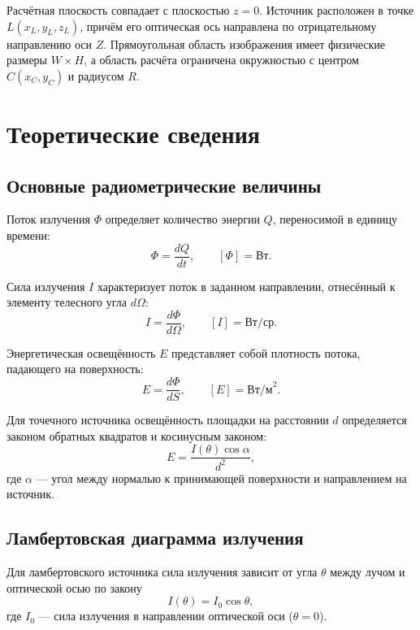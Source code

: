 \documentclass[a4paper,12pt]{article}
\begin{document}
Расчётная плоскость совпадает с плоскостью $z=0$. Источник расположен в точке
$L(x_L,y_L,z_L)$, причём его оптическая ось направлена по отрицательному
направлению оси $Z$. Прямоугольная область изображения имеет физические размеры
$W\times H$, а область расчёта ограничена окружностью с центром
$C(x_C,y_C)$ и радиусом $R$.

\section{Теоретические сведения}

\subsection{Основные радиометрические величины}

Поток излучения $\Phi$ определяет количество энергии $Q$, переносимой в единицу
времени:
\begin{equation}
  \Phi=\frac{dQ}{dt}, \qquad [\Phi]=\text{Вт}.
\end{equation}

Сила излучения $I$ характеризует поток в заданном направлении, отнесённый к
элементу телесного угла $d\Omega$:
\begin{equation}
  I=\frac{d\Phi}{d\Omega}, \qquad [I]=\text{Вт/ср}.
\end{equation}

Энергетическая освещённость $E$ представляет собой плотность потока,
падающего на поверхность:
\begin{equation}
  E=\frac{d\Phi}{dS}, \qquad [E]=\text{Вт/м}^{2}.
\end{equation}

Для точечного источника освещённость площадки на расстоянии $d$ определяется
законом обратных квадратов и косинусным законом:
\begin{equation}
  E=\frac{I(\theta)\cos\alpha}{d^{2}},
  \label{eq:inverse-square}
\end{equation}
где $\alpha$ --- угол между нормалью к принимающей поверхности и направлением
на источник.

\subsection{Ламбертовская диаграмма излучения}

Для ламбертовского источника сила излучения зависит от угла $\theta$ между
лучом и оптической осью по закону
\begin{equation}
  I(\theta)=I_0\cos\theta,
  \label{eq:lambert}
\end{equation}
где $I_0$ --- сила излучения в направлении оптической оси ($\theta=0$).
\end{document}
